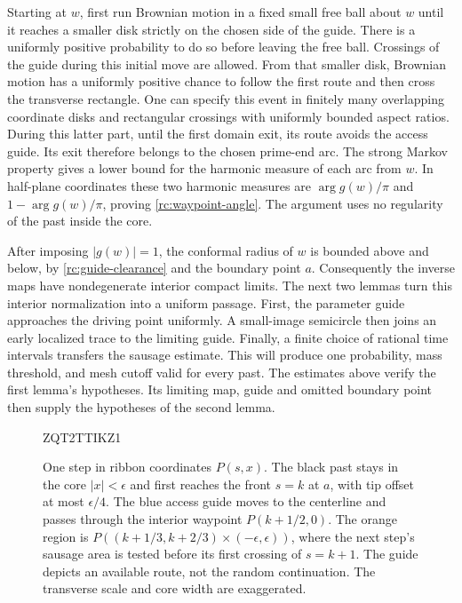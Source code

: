 \documentclass[11pt]{article}
\theoremstyle{definition}
\theoremstyle{remark}
\numberwithin{equation}{section}
\begin{document}
Starting at $w$, first run Brownian motion in a fixed small free ball
about $w$ until it reaches a smaller disk strictly on the chosen side of
the guide.  There is a uniformly positive probability to do so before
leaving the free ball.  Crossings of the guide during this initial move
are allowed.  From that smaller disk, Brownian motion has a uniformly
positive chance to follow the first route and then cross the transverse
rectangle.  One can specify this event in finitely many overlapping
coordinate disks and rectangular crossings with uniformly bounded aspect
ratios.  During this latter part, until the first domain exit, its route
avoids the access guide.  Its exit therefore belongs to the chosen
prime-end arc.  The strong Markov property gives a lower bound for the harmonic
measure of each arc from $w$.  In half-plane coordinates these two
harmonic measures are $\arg g(w)/\pi$ and $1-\arg g(w)/\pi$, proving
\eqref{rc:waypoint-angle}.  The argument uses no regularity of the past
inside the core.

After imposing $|g(w)|=1$, the conformal radius of $w$ is bounded above
and below, by \eqref{rc:guide-clearance} and the boundary point $a$.
Consequently the inverse maps have nondegenerate interior compact
limits.  The next two lemmas turn this interior normalization into a uniform
passage. First, the parameter guide approaches the driving point
uniformly. A small-image semicircle then joins an early localized trace
to the limiting guide. Finally, a finite choice of rational time
intervals transfers the sausage estimate. This will produce one
probability, mass threshold, and mesh cutoff valid for every past.
The estimates above verify the first lemma's hypotheses. Its limiting
map, guide and omitted boundary point then supply the hypotheses of
the second lemma.


\begin{figure}[tbp]

\begingroup
{}
ZQT2TTIKZ1
\endgroup

\caption{
One step in ribbon coordinates $P(s,x)$. The black past stays in the core $|x|<\epsilon$ and first reaches the front $s=k$ at $a$, with tip offset at most $\epsilon/4$. The blue access guide moves to the centerline and passes through the interior waypoint $P(k+1/2,0)$. The orange region is $P((k+1/3,k+2/3)\times(-\epsilon,\epsilon))$, where the next step's sausage area is tested before its first crossing of $s=k+1$. The guide depicts an available route, not the random continuation. The transverse scale and core width are exaggerated.
}
\label{fig:ribbon-front}
\end{figure}
\end{document}
